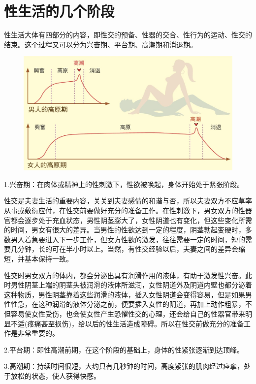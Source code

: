 \documentclass[12pt,UTF8]{ctexbook}
\begin{document}
\chapter{性生活的几个阶段}

性生活大体有四部分的内容，即性交的预备、性器的交合、性行为的运动、性交的结束。这个过程又可以分为兴奋期、平台期、高潮期和消退期。

\begin{figure}[htbp]
	\includegraphics[width=1\linewidth]{6}
	\caption{}
	\label{fig:1}
\end{figure}

1.兴奋期：在肉体或精神上的性刺激下，性欲被唤起，身体开始处于紧张阶段。

性交是夫妻生活的重要内容，关关到夫妻感情的和谐与否，所以夫妻双方不应草率从事或敷衍应付，在性交前要做好充分的准备工作。在性刺激下，男女双方的性器官都会逐步处于充血状态，男性阴茎膨大了，女性阴道也有变化，但这些变化所需的时间，男女有很大的差异。当男性的性欲达到一定的程度，阴茎勃起变硬时，多数男人着急要进入下一步工作，但女方性欲的激发，往往需要一定的时间，短的需要几分钟，长的可在半小时以上。当然，有性交经验以后，夫妻之间的差异会缩短，并基本保持一致。

性交时男女双方的体内，都会分泌出具有润滑作用的液体，有助于激发性兴奋。此时男性阴茎上端的阴茎头被润滑的液体所滋润，女性阴道外及阴道内壁也都分泌着这种物质，男性阴茎靠着这些润滑的液体，插入女性阴道会变得容易，但是如果男性性急，在这种润滑的液体分泌之前，便要插入女性的阴道，再加上动作粗暴，不但容易使女性受伤，也会使女性产生恐懼性交的心理，还会给自己的性器官带来明显不适(疼痛甚至损伤)，给以后的性生活造成障碍。所以在性交前做充分的准备工作是非常重要的。

2.平台期：即性高潮前期，在这个阶段的基础上，身体的性紧张逐渐到达顶峰。

3.高潮期：持续时间很短，大约只有几秒钟的时间，高度紧张的肌肉经过痉挛，处于放松的状态，使人获得快感。
\end{document}
